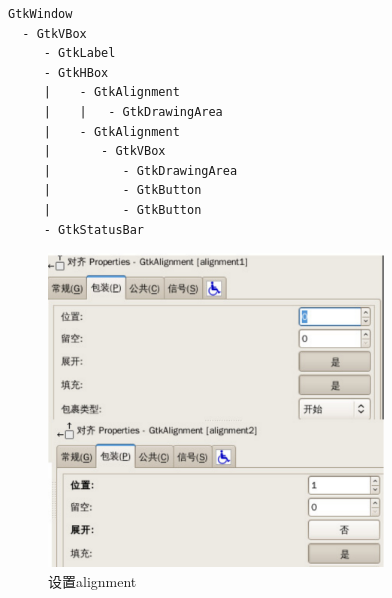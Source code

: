 \begin{shell}
\begin{verbatim}
GtkWindow
  - GtkVBox
     - GtkLabel
     - GtkHBox
     |    - GtkAlignment
     |    |   - GtkDrawingArea
     |    - GtkAlignment
     |       - GtkVBox
     |          - GtkDrawingArea
     |          - GtkButton  
     |          - GtkButton
     - GtkStatusBar
\end{verbatim}
\end{shell}

\begin{figure}[htbp]
  \centering
  \includegraphics[width=3.5in]{images/align}
  \caption{	设置alignment}
  \label{fig:align}
\end{figure}
